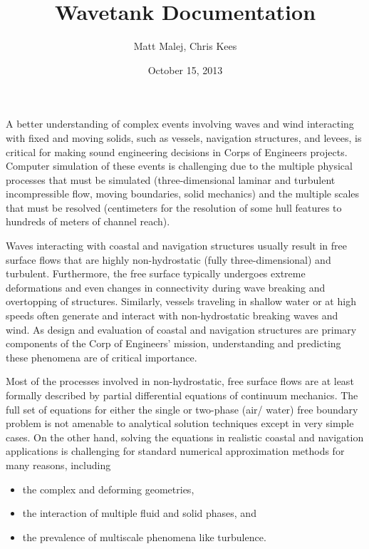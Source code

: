 \documentclass[letterpaper,12pt,english]{sphinxmanual}
\title{Wavetank Documentation}
\date{October 15, 2013}
\author{Matt Malej, Chris Kees}
\begin{document}
\maketitle
\tableofcontents
{}\label{index::doc}


A better understanding of complex events involving waves and wind interacting with fixed and moving solids, such as vessels, navigation structures, and levees, is critical for making sound engineering decisions in Corps of Engineers projects. Computer simulation of these events is challenging due to the multiple physical processes that must be simulated (three-dimensional laminar and turbulent incompressible flow, moving boundaries, solid mechanics) and the multiple scales that must be resolved (centimeters for the resolution of some hull features to hundreds of meters of channel reach).

Waves interacting with coastal and navigation structures usually result in free surface flows that are highly non-hydrostatic (fully three-dimensional) and turbulent. Furthermore, the free surface typically undergoes extreme deformations and even changes in connectivity during wave breaking and overtopping of structures. Similarly, vessels traveling in shallow water or at high speeds often generate and interact with non-hydrostatic breaking waves and wind. As design and evaluation of coastal and navigation structures are primary components of the Corp of Engineers’ mission, understanding and predicting these phenomena are of critical importance.

Most of the processes involved in non-hydrostatic, free surface flows are at least formally described by partial differential equations of continuum mechanics. The full set of equations for either the single or two-phase (air/ water) free boundary problem is not amenable to analytical solution techniques except in very simple cases. On the other hand, solving the equations in realistic coastal and navigation applications is challenging for standard numerical approximation methods for many reasons, including
\begin{itemize}
\item {} 
the complex and deforming geometries,

\item {} 
the interaction of multiple fluid and solid phases, and

\item {} 
the prevalence of multiscale phenomena like turbulence.

\end{itemize}
\end{document}
